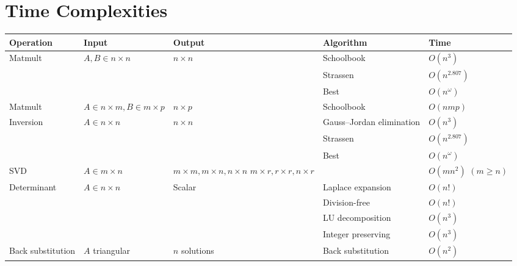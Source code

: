 \section{Time Complexities}
\begin{center}
{\footnotesize\renewcommand{\arraystretch}{1.2}
\begin{tabular}{p{1.5cm}p{3cm}p{3cm}p{4cm}p{1cm}}
\textbf{Operation}             & \textbf{Input}                   & \textbf{Output}    & \textbf{Algorithm}                     & \textbf{Time}   \\ \hline
Matmult
    & $A,B\in n\times n$
    & $n \times n$
    & Schoolbook
    & $O(n^3)$
    \\ \hline

    &
    &
    & Strassen~\citep{Strassen1969}
    & $O(n^{2.807})$
    \\ \hline

    &
    &
    & Best
    & $O(n^\omega)$
    \\ \hline
Matmult
    & $A\in n\times m, B\in m\times p$
    & $n \times p$
    & Schoolbook
    & $O(nmp)$
    \\ \hline
Inversion
    & $A\in n\times n$
    & $n \times n$
    & Gauss--Jordan elimination
    & $O(n^3)$
    \\ \hline

    &
    &
    & Strassen~\citep{Strassen1969}
    & $O(n^{2.807})$
    \\ \hline

    &
    &
    & Best
    & $O(n^\omega)$
    \\ \hline
SVD
    & $A\in m\times n$
    & $m\times m, m\times n, n\times n$ \newline $m\times r, r\times r, n\times r$
    &
    & $O(mn^2)$ \newline \hbox{$(m\ge n)$} \\ \hline
Determinant
    & $A\in n\times n$
    & Scalar
    & Laplace expansion
    & $O(n!)$         \\ \hline

    &
    &
    & Division-free~\citep{Rote2001}
    & $O(n!)$
    \\ \hline

    &
    &
    & LU decomposition
    & $O(n^3)$
    \\ \hline

    &
    &
    & Integer preserving~\citep{Bareiss1968}
    & $O(n^3)$
    \\ \hline
Back \newline substitution
    & $A$ triangular
    & $n$ solutions
    & Back substitution
    & $O(n^2)$
    \\ \hline
\end{tabular}
}
\end{center}

